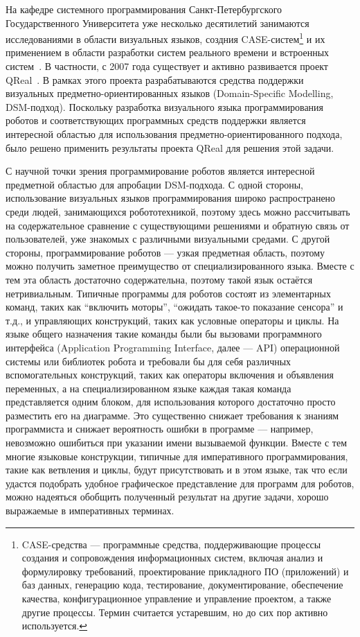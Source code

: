 \documentclass[a4paper]{article}
\begin{document}
На кафедре системного программирования Санкт-Петербургского Государственного Университета уже несколько десятилетий занимаются исследованиями в области визуальных языков, создния CASE-систем\footnote{CASE-средства --- программные средства, поддерживающие процессы создания и сопровождения информационных систем, включая анализ и формулировку требований, проектирование прикладного ПО (приложений) и баз данных, генерацию кода, тестирование, документирование, обеспечение качества, конфигурационное управление и управление проектом, а также другие процессы. Термин считается устаревшим, но до сих пор активно используется.} и их применением в области разработки систем реального времени и встроенных систем~\cite{rtst1, rtst2, rtst3, videoDsl, dsmPlatforms, real1, real2, student1, student2, msfDsm, msfDsm2}. В частности, с 2007 года существует и активно развивается проект QReal~\cite{qReal}. В рамках этого проекта разрабатываются средства поддержки визуальных предметно-ориентированных языков (Domain-Specific Modelling, DSM-подход). Поскольку разработка визуального языка программирования роботов и соответствующих программных средств поддержки является интересной областью для использования предметно-ориентированного подхода, было решено применить результаты проекта QReal для решения этой задачи.  

С научной точки зрения программирование роботов является интересной предметной областью для апробации DSM-подхода. С одной стороны, использование визуальных языков программирования широко распространено среди людей, занимающихся робототехникой, поэтому здесь можно рассчитывать на содержательное сравнение с существующими решениями и обратную связь от пользователей, уже знакомых с различными визуальными средами. С другой стороны, программирование роботов --- узкая предметная область, поэтому можно получить заметное преимущество от специализированного языка. Вместе с тем эта область достаточно содержательна, поэтому такой язык остаётся нетривиальным. Типичные программы для роботов состоят из элементарных команд, таких как ``включить моторы'', ``ожидать такое-то показание сенсора'' и т.д., и управляющих конструкций, таких как условные операторы и циклы. На языке общего назначения такие команды были бы вызовами программного интерфейса (Application Programming Interface, далее --- API) операционной системы или библиотек робота и требовали бы для себя различных вспомогательных конструкций, таких как операторы включения и объявления переменных, а на специализированном языке каждая такая команда представляется одним блоком, для использования которого достаточно просто разместить его на диаграмме. Это существенно снижает требования к знаниям программиста и снижает вероятность ошибки в программе --- например, невозможно ошибиться при указании имени вызываемой функции. Вместе с тем многие языковые конструкции, типичные для императивного программирования, такие как ветвления и циклы, будут присутствовать и в этом языке, так что если удастся подобрать удобное графическое представление для программ для роботов, можно надеяться обобщить полученный результат на другие задачи, хорошо выражаемые в императивных терминах.
\end{document}
